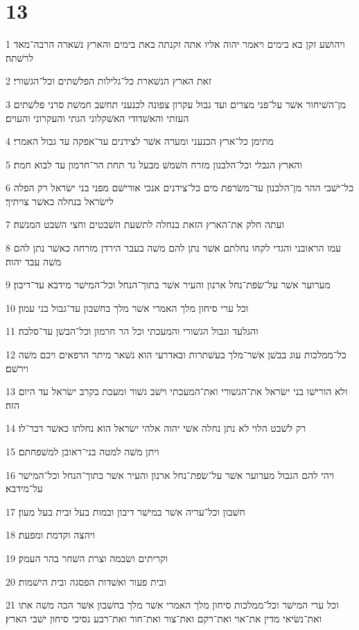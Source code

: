 \chapter{13}

\par 1 ויהושׁע זקן בא בימים ויאמר יהוה אליו אתה זקנתה באת בימים והארץ נשׁארה הרבה־מאד לרשׁתה׃
\par 2 זאת הארץ הנשׁארת כל־גלילות הפלשׁתים וכל־הגשׁורי׃
\par 3 מן־השׁיחור אשׁר על־פני מצרים ועד גבול עקרון צפונה לכנעני תחשׁב חמשׁת סרני פלשׁתים העזתי והאשׁדודי האשׁקלוני הגתי והעקרוני והעוים׃
\par 4 מתימן כל־ארץ הכנעני ומערה אשׁר לצידנים עד־אפקה עד גבול האמרי׃
\par 5 והארץ הגבלי וכל־הלבנון מזרח השׁמשׁ מבעל גד תחת הר־חרמון עד לבוא חמת׃
\par 6 כל־ישׁבי ההר מן־הלבנון עד־משׂרפת מים כל־צידנים אנכי אורישׁם מפני בני ישׂראל רק הפלה לישׂראל בנחלה כאשׁר צויתיך׃
\par 7 ועתה חלק את־הארץ הזאת בנחלה לתשׁעת השׁבטים וחצי השׁבט המנשׁה׃
\par 8 עמו הראובני והגדי לקחו נחלתם אשׁר נתן להם משׁה בעבר הירדן מזרחה כאשׁר נתן להם משׁה עבד יהוה׃
\par 9 מערוער אשׁר על־שׂפת־נחל ארנון והעיר אשׁר בתוך־הנחל וכל־המישׁר מידבא עד־דיבון׃
\par 10 וכל ערי סיחון מלך האמרי אשׁר מלך בחשׁבון עד־גבול בני עמון׃
\par 11 והגלעד וגבול הגשׁורי והמעכתי וכל הר חרמון וכל־הבשׁן עד־סלכה׃
\par 12 כל־ממלכות עוג בבשׁן אשׁר־מלך בעשׁתרות ובאדרעי הוא נשׁאר מיתר הרפאים ויכם משׁה וירשׁם׃
\par 13 ולא הורישׁו בני ישׂראל את־הגשׁורי ואת־המעכתי וישׁב גשׁור ומעכת בקרב ישׂראל עד היום הזה׃
\par 14 רק לשׁבט הלוי לא נתן נחלה אשׁי יהוה אלהי ישׂראל הוא נחלתו כאשׁר דבר־לו׃
\par 15 ויתן משׁה למטה בני־ראובן למשׁפחתם׃
\par 16 ויהי להם הגבול מערוער אשׁר על־שׂפת־נחל ארנון והעיר אשׁר בתוך־הנחל וכל־המישׁר על־מידבא׃
\par 17 חשׁבון וכל־עריה אשׁר במישׁר דיבון ובמות בעל ובית בעל מעון׃
\par 18 ויהצה וקדמת ומפעת׃
\par 19 וקריתים ושׂבמה וצרת השׁחר בהר העמק׃
\par 20 ובית פעור ואשׁדות הפסגה ובית הישׁמות׃
\par 21 וכל ערי המישׁר וכל־ממלכות סיחון מלך האמרי אשׁר מלך בחשׁבון אשׁר הכה משׁה אתו ואת־נשׂיאי מדין את־אוי ואת־רקם ואת־צור ואת־חור ואת־רבע נסיכי סיחון ישׁבי הארץ׃
